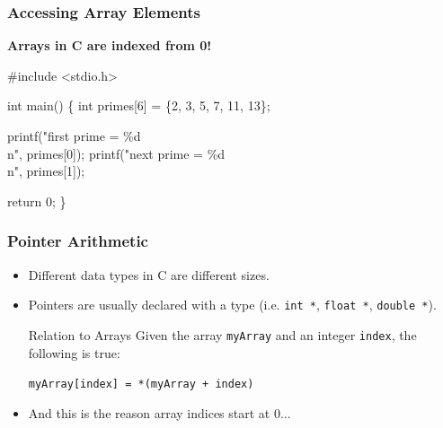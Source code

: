 \documentclass[table]{beamer}
\newif\ifschigh\schighfalse
\newcommand{\kw}[1]{\ifschigh\textcolor{red}{#1}\else\textcolor{keyword}{#1}\fi}
\newcommand{\kt}[1]{\ifschigh\textcolor{red}{#1}\else\textcolor{ctext}{#1}\fi}
\begin{document}
\begin{frame}[fragile]
\frametitle{Accessing Array Elements}
\begin{alertblock}{}
\begin{center}
\bf Arrays in C are indexed from 0!
\end{center}
\end{alertblock}
\begin{semiverbatim}
\kw{\#include} \kt{<stdio.h>}

\kw{int} main()
\{
   \kw{int} primes[6] = \{2, 3, 5, 7, 11, 13\};

   printf(\kt{"first prime = \%d\\n"}, primes[0]);
   printf(\kt{"next prime = \%d\\n"}, primes[1]);
   
   \kw{return} 0;   
\}
\end{semiverbatim}
\end{frame}

{
\begin{frame}[fragile]
\frametitle{Pointer Arithmetic}
\begin{itemize}
\item Different data types in C are different sizes.
\item Pointers are usually declared with a type (i.e. {\tt \kw{int} *},
{\tt \kw{float} *}, {\tt \kw{double} *}).


\begin{alertblock}{Relation to Arrays}
Given the array {\tt myArray} and an integer {\tt index}, the following is true:
\begin{center}
\tt myArray[index] = *(myArray + index)
\end{center}
\end{alertblock}

\item And this is the reason array indices start at 0...
\end{itemize}

\end{frame}
}
\end{document}
